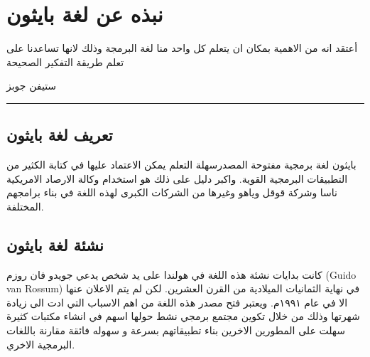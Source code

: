 \chapter{نبذه عن لغة بايثون}
\noindent
أعتقد انه من الاهمية بمكان ان يتعلم كل واحد منا لغة البرمجة وذلك لانها  تساعدنا على تعلم طريقة التفكير الصحيحة
\begin{flushright} 
ستيفن جوبز
\end{flushright}
\rule{\textwidth}{1pt}
\section{تعريف لغة بايثون }
بايثون لغة برمجية مفتوحة المصدرسهلة التعلم يمكن الاعتماد عليها في كتابة الكثير من التطبيقات البرمجية القوية. واكبر دليل على ذلك هو استخدام وكالة الارصاد الامريكية ناسا وشركة قوقل وياهو وغيرها من الشركات الكبرى لهذه اللغة في بناء برامجهم المختلفة. 
\section{نشئة لغة بايثون}

كانت بدايات نشئة هذه اللغة في هولندا على يد شخص يدعي جويدو فان روزم
\textenglish{(Guido van Rossum)}
 في نهاية الثمانيات الميلادية من القرن العشرين. لكن لم يتم الاعلان عنها الا في عام ١٩٩١م.   ويعتبر فتح مصدر هذه اللغة من اهم الاسباب التي ادت الى زيادة شهرتها وذلك من خلال تكوين مجتمع برمجي نشط حولها اسهم في  انشاء مكتبات كثيرة سهلت على المطورين الاخرين بناء تطبيقاتهم بسرعة و سهوله فائقة مقارنة باللغات البرمجية الاخري.

